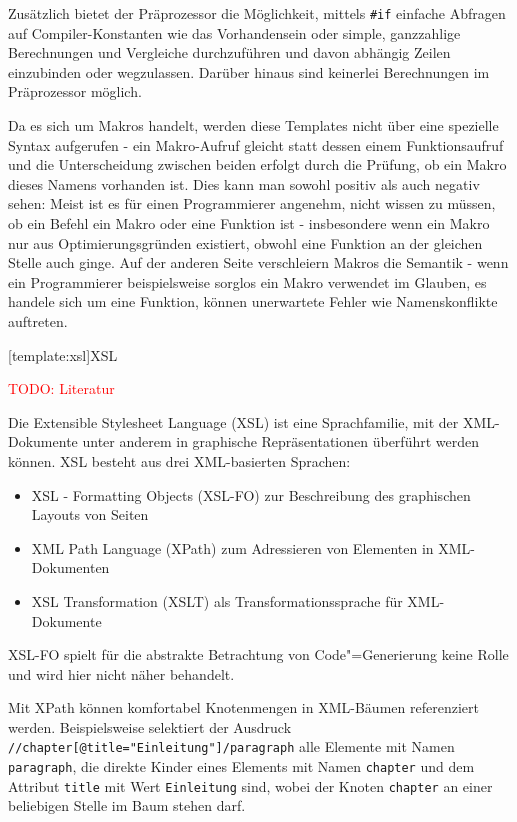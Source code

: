 \documentclass[11pt, a4paper, bibgerm]{scrbook}
\newcommand\icode[1]{\lstinline?#1?}
\newcommand{\todo}[1]{
  \textcolor{red}{TODO: #1}
}
\newcommand\lsection{}
\newcommand{\cgen}{Code"=Generierung}
\begin{document}
Zusätzlich bietet der Präprozessor die Möglichkeit, mittels \icode{#if}
einfache Abfragen auf Compiler-Konstanten wie das Vorhandensein oder
simple, ganzzahlige Berechnungen und Vergleiche durchzuführen und davon
abhängig Zeilen einzubinden oder wegzulassen. Darüber hinaus sind
keinerlei Berechnungen im Präprozessor möglich.

Da es sich um Makros handelt, werden diese Templates nicht über eine
spezielle Syntax aufgerufen - ein Makro-Aufruf gleicht statt dessen
einem Funktionsaufruf und die Unterscheidung zwischen beiden erfolgt
durch die Prüfung, ob ein Makro dieses Namens vorhanden ist. Dies kann
man sowohl positiv als auch negativ sehen: Meist ist es für einen
Programmierer angenehm, nicht wissen zu müssen, ob ein Befehl ein Makro
oder eine Funktion ist - insbesondere wenn ein Makro nur aus
Optimierungsgründen existiert, obwohl eine Funktion an der gleichen
Stelle auch ginge. Auf der anderen Seite verschleiern Makros die
Semantik - wenn ein Programmierer beispielsweise sorglos ein Makro
verwendet im Glauben, es handele sich um eine Funktion, können
unerwartete Fehler wie Namenskonflikte auftreten.

\lsection[template:xsl]{XSL}

\todo{Literatur}

Die Extensible Stylesheet Language (XSL) ist eine Sprachfamilie, mit der
XML-Dokumente unter anderem in graphische Repräsentationen überführt
werden können. XSL besteht aus drei XML-basierten Sprachen:
\begin{itemize}
\item XSL - Formatting Objects (XSL-FO) zur Beschreibung des graphischen Layouts von Seiten
\item XML Path Language (XPath) zum Adressieren von Elementen in XML-Dokumenten
\item XSL Transformation (XSLT) als Transformationssprache für XML-Dokumente
\end{itemize}
XSL-FO spielt für die abstrakte Betrachtung von \cgen{} keine Rolle und
wird hier nicht näher behandelt.

Mit XPath können komfortabel Knotenmengen in XML-Bäumen referenziert
werden. Beispielsweise selektiert der Ausdruck
\icode{//chapter[@title="Einleitung"]/paragraph} alle Elemente mit Namen
\icode{paragraph}, die direkte Kinder eines Elements mit Namen
\icode{chapter} und dem Attribut \icode{title} mit Wert
\icode{Einleitung} sind, wobei der Knoten \icode{chapter} an einer
beliebigen Stelle im Baum stehen darf.
\end{document}
